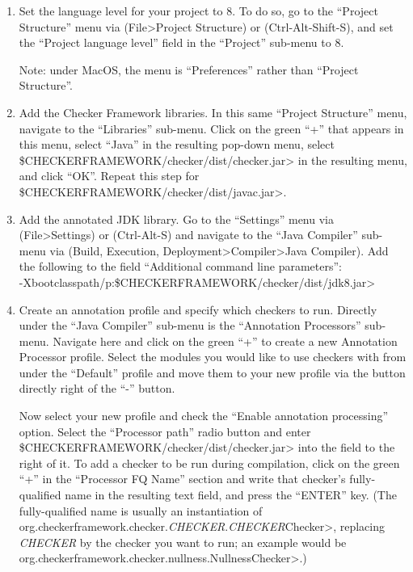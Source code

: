 \begin{enumerate}

\item
  Set the language level for your project to 8.  To do so, go to the
  ``Project Structure'' menu via (File>Project Structure) or
  (Ctrl-Alt-Shift-S), and set the ``Project language level'' field in the
  ``Project'' sub-menu to 8.

  Note: under MacOS, the menu is ``Preferences'' rather than ``Project Structure''.

\item
  Add the Checker Framework libraries.  In this same ``Project Structure''
  menu, navigate to the ``Libraries'' sub-menu.  Click on the green ``+'' that
  appears in this menu, select ``Java'' in the resulting pop-down menu,
  select \<\$CHECKERFRAMEWORK/checker/dist/checker.jar> in the resulting menu,
  and click ``OK''. Repeat this step for
  \<\$CHECKERFRAMEWORK/checker/dist/javac.jar>.

\item
  Add the annotated JDK library.
  Go to the ``Settings'' menu via (File>Settings) or (Ctrl-Alt-S) and
  navigate to the ``Java Compiler'' sub-menu via (Build, Execution,
  Deployment>Compiler>Java Compiler).  Add the following to the field
  ``Additional command line parameters'': \\
  \<-Xbootclasspath/p:\$CHECKERFRAMEWORK/checker/dist/jdk8.jar>

\item
  Create an annotation profile and specify which checkers to run.
  Directly under the ``Java Compiler'' sub-menu is the ``Annotation
  Processors'' sub-menu. Navigate here and click on the green ``+'' to create
  a new Annotation Processor profile. Select the modules you would like to
  use checkers with from under the ``Default'' profile and move them to your
  new profile via the button directly right of the ``-'' button.

  Now select your new profile and check the ``Enable annotation processing''
  option. Select the ``Processor path'' radio button and enter
  \<\$CHECKERFRAMEWORK/checker/dist/checker.jar> into the field to the right
  of it. To add a checker to be run during compilation, click on the green
  ``+'' in the ``Processor FQ Name'' section and write that checker's
  fully-qualified name in
  the resulting text field, and press the ``ENTER'' key.
  (The fully-qualified name is usually an instantiation of
  \<org.checkerframework.checker.\emph{CHECKER}.\emph{CHECKER}Checker>,
  replacing \emph{CHECKER} by the checker you
  want to run; an example would be
  \<org.checkerframework.checker.nullness.NullnessChecker>.)

\end{enumerate}

